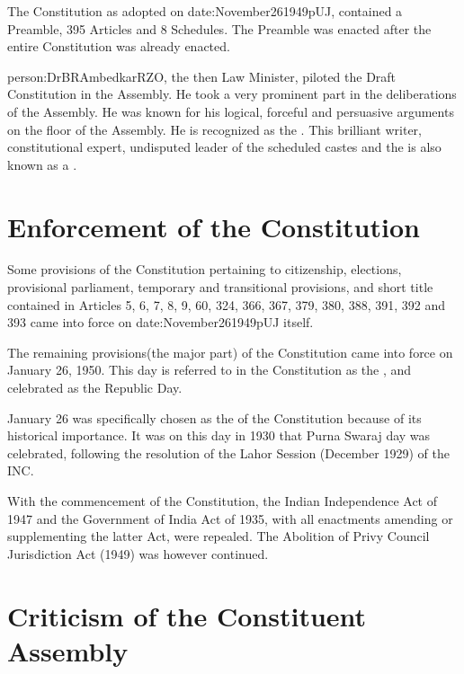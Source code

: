 { The Constitution as adopted on \gls{date:November261949pUJ}, contained a Preamble, 395 Articles and 8 Schedules}. The Preamble was enacted after the entire Constitution was already enacted.

\gls{person:DrBRAmbedkarRZO}, the then Law Minister, piloted the Draft Constitution in the Assembly. He took a very prominent part in the deliberations of the Assembly. He was known for his logical, forceful and persuasive arguments on the floor of the Assembly. He is recognized as the . This brilliant writer, constitutional expert, undisputed leader of the scheduled castes and the  is also known as a .

\section{Enforcement of the Constitution}

Some provisions of the Constitution pertaining to citizenship, elections, provisional parliament, temporary and transitional provisions, and short title contained in Articles 5, 6, 7, 8, 9, 60, 324, 366, 367, 379, 380, 388, 391, 392 and 393 came into force on \gls{date:November261949pUJ} itself.

The remaining provisions(the major part) of the Constitution came into force on January 26, 1950. This day is referred to in the Constitution as the , and celebrated as the Republic Day.

January 26 was specifically chosen as the  of the Constitution because of its historical importance. It was on this day in 1930 that { Purna Swaraj} day was celebrated, following the resolution of the Lahor Session (December 1929) of the INC.

With the commencement of the Constitution, the Indian Independence Act of 1947 and the Government of India Act of 1935, with all enactments amending or supplementing the latter Act, were repealed. The Abolition of Privy Council Jurisdiction Act (1949) was however continued.

\section{Criticism of the Constituent Assembly}

